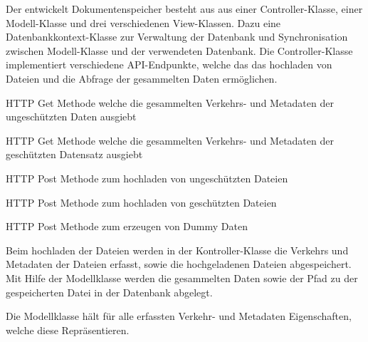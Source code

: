 \documentclass[
    fontsize=12pt,
    headings=small,
    parskip=half,           %
    bibliography=totoc,
    numbers=noenddot,       %
    open=any,               %
    ]{scrreprt}
\begin{document}
Der entwickelt Dokumentenspeicher besteht aus aus einer Controller-Klasse, einer Modell-Klasse und drei verschiedenen View-Klassen.
Dazu eine Datenbankkontext-Klasse zur Verwaltung der Datenbank und Synchronisation zwischen Modell-Klasse und der verwendeten Datenbank.
Die Controller-Klasse implementiert verschiedene API-Endpunkte, welche das das hochladen von Dateien und die Abfrage der gesammelten Daten ermöglichen.

\begin{description}[style=nextline]   
\item[/api/GetA] HTTP Get Methode welche die gesammelten Verkehrs- und Metadaten der ungeschützten Daten ausgiebt
\item[/api/GetB] HTTP Get Methode welche die gesammelten Verkehrs- und Metadaten der geschützten Datensatz ausgiebt
\item[/api/uploadA] HTTP Post Methode zum hochladen von ungeschützten Dateien
\item[/api/uploadB] HTTP Post Methode zum hochladen von geschützten Dateien
\item[api/uploadEmu] HTTP Post Methode zum erzeugen von Dummy Daten
\end{description}

Beim hochladen der Dateien werden in der Kontroller-Klasse die Verkehrs und Metadaten der Dateien erfasst, sowie die hochgeladenen Dateien abgespeichert.
Mit Hilfe der Modellklasse werden die gesammelten Daten sowie der Pfad zu der gespeicherten Datei in der Datenbank abgelegt.

Die Modellklasse hält für alle erfassten Verkehr- und Metadaten Eigenschaften, welche diese Repräsentieren. 
 
\end{document}
